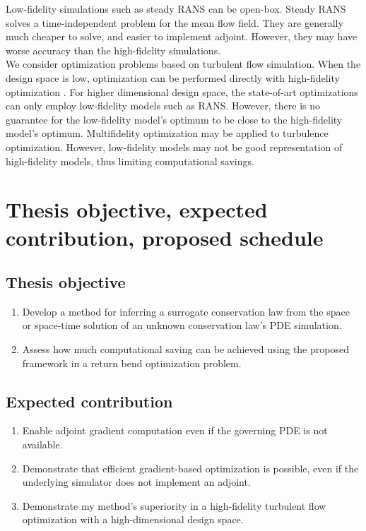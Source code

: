 \documentclass[a4paper,onecolumn]{article}
\theoremstyle{remark}
\begin{document}
\noindent Low-fidelity simulations such as steady RANS can be open-box. 
Steady RANS solves a time-independent problem for the mean flow field.
They are generally much cheaper to solve, and easier to implement adjoint. However,
they may have worse accuracy than the high-fidelity simulations.\\

\noindent We consider optimization problems based on turbulent flow simulation. 
When the design space is low, optimization can be performed directly with high-fidelity optimization
\cite{Chai opt}. For higher dimensional design space, the state-of-art optimizations can
only employ low-fidelity models such as RANS. However, there is no guarantee for
the low-fidelity model's optimum to be close to the high-fidelity model's optimum.
Multifidelity optimization may be applied to turbulence optimization. 
However, low-fidelity models may not be good representation of high-fidelity models, thus limiting computational savings. \\


\newpage
\section{Thesis objective, expected contribution, proposed schedule}

\subsection{Thesis objective}
\begin{enumerate}
    \item Develop a method for inferring a surrogate conservation law 
    from the space or space-time solution of an unknown conservation law's PDE simulation.
    \item Assess how much computational saving can be achieved using
    the proposed framework in a return bend optimization problem.
\end{enumerate}

\subsection{Expected contribution}
\begin{enumerate}
    \item Enable adjoint gradient computation even if the governing PDE is not available.
    \item Demonstrate that efficient gradient-based optimization is possible, even if the underlying simulator does not implement
          an adjoint.
    \item Demonstrate my method's superiority in a high-fidelity turbulent flow optimization with a
    high-dimensional design space.
\end{enumerate}
\end{document}
